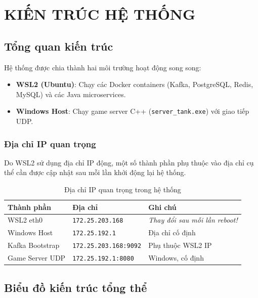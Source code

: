 \documentclass[12pt,a4paper]{report}
\begin{document}
\chapter{KIẾN TRÚC HỆ THỐNG}

\section{Tổng quan kiến trúc}

Hệ thống được chia thành hai môi trường hoạt động song song:

\begin{itemize}
  \item \textbf{WSL2 (Ubuntu)}: Chạy các Docker containers (Kafka, PostgreSQL, Redis, MySQL) và các Java microservices.
  \item \textbf{Windows Host}: Chạy game server C++ (\texttt{server\_tank.exe}) với giao tiếp UDP.
\end{itemize}

\subsection{Địa chỉ IP quan trọng}

Do WSL2 sử dụng địa chỉ IP động, một số thành phần phụ thuộc vào địa chỉ cụ thể cần được cập nhật sau mỗi lần khởi động lại hệ thống.

\begin{table}[H]
\centering
\caption{Địa chỉ IP quan trọng trong hệ thống}
\label{tab:ipaddress}
\begin{tabular}{lll}
\toprule
\textbf{Thành phần} & \textbf{Địa chỉ} & \textbf{Ghi chú} \\
\midrule
WSL2 eth0       & \texttt{172.25.203.168} & \textit{Thay đổi sau mỗi lần reboot!} \\
Windows Host    & \texttt{172.25.192.1}   & Địa chỉ cố định \\
Kafka Bootstrap & \texttt{172.25.203.168:9092} & Phụ thuộc WSL2 IP \\
Game Server UDP & \texttt{172.25.192.1:8080}   & Windows, cố định \\
\bottomrule
\end{tabular}
\end{table}

\section{Biểu đồ kiến trúc tổng thể}
\end{document}

